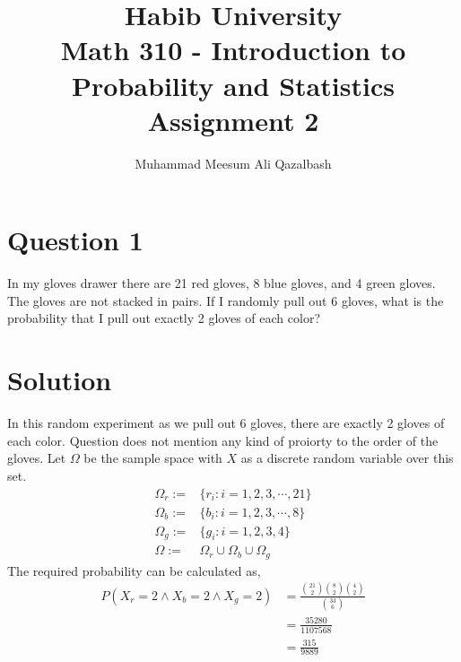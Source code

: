 \documentclass[a4paper, 11pt]{article}
\title{Habib University\\Math 310 - Introduction to Probability and Statistics\\Assignment 2}
\author{Muhammad Meesum Ali Qazalbash}
\begin{document}
\setlength{\parskip}{10pt}
\setlength{\parindent}{0pt}
\maketitle


\section*{Question 1} In my gloves drawer there are 21 red gloves, 8 blue gloves, and 4 green gloves. The gloves are not stacked in pairs. If I randomly pull out 6 gloves, what is the probability that I pull out exactly 2 gloves of each color?
\section*{Solution}
In this random experiment as we pull out 6 gloves, there are exactly 2 gloves of each color. Question does not mention any kind of proiorty to the order of the gloves. Let $\Omega$ be the sample space with $X$ as a discrete random variable over this set.
\begin{align*}
    \Omega_{r}:= & \{r_{i}:i=1,2,3,\cdots,21\}            \\
    \Omega_{b}:= & \{b_{i}:i=1,2,3,\cdots,8\}             \\
    \Omega_{g}:= & \{g_{i}:i=1,2,3,4\}                    \\
    \Omega:=     & \Omega_{r}\cup\Omega_{b}\cup\Omega_{g}
\end{align*}
The required probability can be calculated as,
\begin{equation*}
    \begin{split}
        P(X_{r}=2\wedge X_{b}=2\wedge X_{g}=2)&=\frac{\binom{21}{2}\binom{8}{2}\binom{4}{2}}{\binom{33}{6}}\\
        &=\frac{35280}{1107568}\\
        &=\frac{315}{9889}
    \end{split}
\end{equation*}
\end{document}
